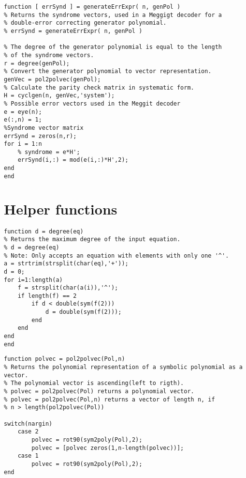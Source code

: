 \documentclass[MiniProjectMain]{subfiles}
\begin{document}
\newpage
\begin{lstlisting}[caption= Generation of error syndrome vectors.]
function [ errSynd ] = generateErrExpr( n, genPol )
% Returns the syndrome vectors, used in a Meggigt decoder for a 
% double-error correcting generator polynomial.
% errSynd = generateErrExpr( n, genPol )

% The degree of the generator polynomial is equal to the length 
% of the syndrome vectors.
r = degree(genPol);
% Convert the generator polynomial to vector representation.
genVec = pol2polvec(genPol); 
% Calculate the parity check matrix in systematic form.
H = cyclgen(n, genVec,'system');
% Possible error vectors used in the Meggit decoder
e = eye(n);
e(:,n) = 1;
%Syndrome vector matrix
errSynd = zeros(n,r);
for i = 1:n
    % syndrome = e*H';
    errSynd(i,:) = mod(e(i,:)*H',2);
end
end
\end{lstlisting}

\newpage
\section{Helper functions}
\begin{lstlisting}[caption=Maximum degree of polynomial]
function d = degree(eq)
% Returns the maximum degree of the input equation.
% d = degree(eq)
% Note: Only accepts an equation with elements with only one '^'.
a = strtrim(strsplit(char(eq),'+'));
d = 0;
for i=1:length(a)
    f = strsplit(char(a(i)),'^');
    if length(f) == 2
        if d < double(sym(f(2)))
            d = double(sym(f(2)));
        end
    end
end
end
\end{lstlisting}

\newpage
\begin{lstlisting}[caption=Convert polynomial to vector form.]
function polvec = pol2polvec(Pol,n)
% Returns the polynomial representation of a symbolic polynomial as a vector.
% The polynomial vector is ascending(left to rigth).
% polvec = pol2polvec(Pol) returns a polynomial vector.
% polvec = pol2polvec(Pol,n) returns a vector of length n, if
% n > length(pol2polvec(Pol))

switch(nargin)
    case 2
        polvec = rot90(sym2poly(Pol),2);
        polvec = [polvec zeros(1,n-length(polvec))];
    case 1
        polvec = rot90(sym2poly(Pol),2);
end
\end{lstlisting}
\end{document}
